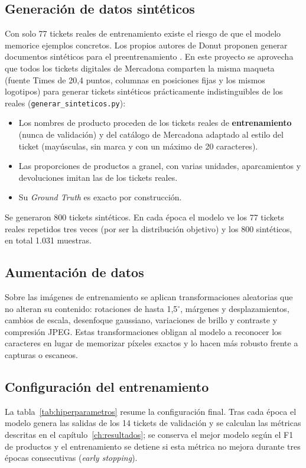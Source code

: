 \subsection{Generación de datos sintéticos}
Con solo 77 tickets reales de entrenamiento existe el riesgo de que el modelo memorice ejemplos concretos. Los propios autores de Donut proponen generar documentos sintéticos para el preentrenamiento \parencite{kim2021donut}. En este proyecto se aprovecha que todos los tickets digitales de Mercadona comparten la misma maqueta (fuente Times de 20,4 puntos, columnas en posiciones fijas y los mismos logotipos) para generar tickets sintéticos prácticamente indistinguibles de los reales (\texttt{generar\_sinteticos.py}):

\begin{itemize}
    \item Los nombres de producto proceden de los tickets reales de \textbf{entrenamiento} (nunca de validación) y del catálogo de Mercadona adaptado al estilo del ticket (mayúsculas, sin marca y con un máximo de 20 caracteres).
    \item Las proporciones de productos a granel, con varias unidades, aparcamientos y devoluciones imitan las de los tickets reales.
    \item Su \textit{Ground Truth} es exacto por construcción.
\end{itemize}

Se generaron 800 tickets sintéticos. En cada época el modelo ve los 77 tickets reales repetidos tres veces (por ser la distribución objetivo) y los 800 sintéticos, en total 1.031 muestras.

\subsection{Aumentación de datos}
Sobre las imágenes de entrenamiento se aplican transformaciones aleatorias que no alteran su contenido: rotaciones de hasta 1,5$^{\circ}$, márgenes y desplazamientos, cambios de escala, desenfoque gaussiano, variaciones de brillo y contraste y compresión JPEG. Estas transformaciones obligan al modelo a reconocer los caracteres en lugar de memorizar píxeles exactos y lo hacen más robusto frente a capturas o escaneos.

\subsection{Configuración del entrenamiento}
La tabla~\ref{tab:hiperparametros} resume la configuración final. Tras cada época el modelo genera las salidas de los 14 tickets de validación y se calculan las métricas descritas en el capítulo~\ref{ch:resultados}; se conserva el mejor modelo según el F1 de productos y el entrenamiento se detiene si esta métrica no mejora durante tres épocas consecutivas (\textit{early stopping}).

